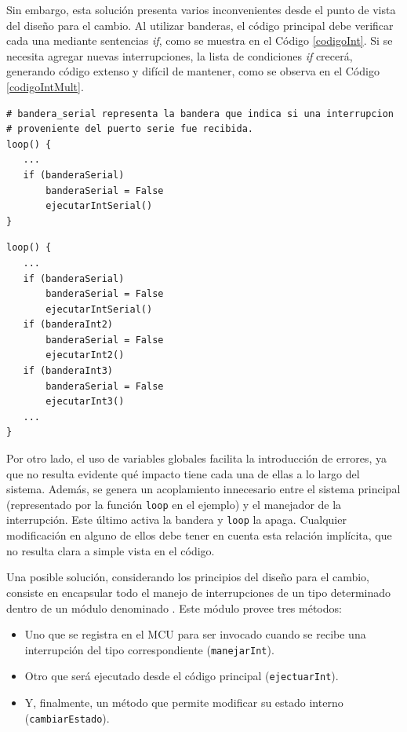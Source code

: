 Sin embargo, esta solución presenta varios inconvenientes desde el punto de vista del diseño para el cambio. Al utilizar banderas, el código principal debe verificar cada una mediante sentencias \textit{if}, como se muestra en el Código \ref{codigoInt}. Si se necesita agregar nuevas interrupciones, la lista de condiciones \textit{if} crecerá, generando código extenso y difícil de mantener, como se observa en el Código \ref{codigoIntMult}.
\begin{lstlisting}[caption=Ejemplo de verificación de bandera de interrupción simple., label=codigoInt]
# bandera_serial representa la bandera que indica si una interrupcion 
# proveniente del puerto serie fue recibida.
loop() {
   ...
   if (banderaSerial)
       banderaSerial = False
       ejecutarIntSerial()
}
\end{lstlisting}

\begin{lstlisting}[caption=Ejemplo de verificación de multiples banderas de interrupción., label=codigoIntMult]
loop() {
   ...
   if (banderaSerial)
       banderaSerial = False
       ejecutarIntSerial()
   if (banderaInt2)
       banderaSerial = False
       ejecutarInt2()
   if (banderaInt3)
       banderaSerial = False
       ejecutarInt3()
   ...
}
\end{lstlisting}

Por otro lado, el uso de variables globales facilita la introducción de errores, ya que no resulta evidente qué impacto tiene cada una de ellas a lo largo del sistema. Además, se genera un acoplamiento innecesario entre el sistema principal (representado por la función \verb|loop| en el ejemplo) y el manejador de la interrupción. Este último activa la bandera y \verb|loop| la apaga. Cualquier modificación en alguno de ellos debe tener en cuenta esta relación implícita, que no resulta clara a simple vista en el código.

Una posible solución, considerando los principios del diseño para el cambio, consiste en encapsular todo el manejo de interrupciones de un tipo determinado dentro de un módulo denominado \Manejador. Este módulo provee tres métodos:
\begin{itemize}
\item Uno que se registra en el \gls{MCU} para ser invocado cuando se recibe una interrupción del tipo correspondiente (\verb|manejarInt|).
\item Otro que será ejecutado desde el código principal (\verb|ejectuarInt|).
\item Y, finalmente, un método que permite modificar su estado interno (\verb|cambiarEstado|).
\end{itemize}

